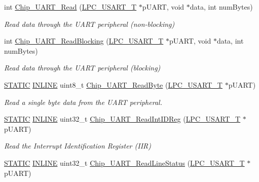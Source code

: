 \begin{DoxyCompactItemize}
int \hyperlink{group__UART__17XX__40XX_ga06dd61ee7d8483847fea746978cb1c93}{Chip\+\_\+\+U\+A\+R\+T\+\_\+\+Read} (\hyperlink{structLPC__USART__T}{L\+P\+C\+\_\+\+U\+S\+A\+R\+T\+\_\+T} $\ast$p\+U\+A\+RT, void $\ast$data, int num\+Bytes)
\begin{DoxyCompactList}\small\item\em Read data through the U\+A\+RT peripheral (non-\/blocking) \end{DoxyCompactList}\item 
int \hyperlink{group__UART__17XX__40XX_ga2b256d39f2fde9f8b923a2f341f5fea3}{Chip\+\_\+\+U\+A\+R\+T\+\_\+\+Read\+Blocking} (\hyperlink{structLPC__USART__T}{L\+P\+C\+\_\+\+U\+S\+A\+R\+T\+\_\+T} $\ast$p\+U\+A\+RT, void $\ast$data, int num\+Bytes)
\begin{DoxyCompactList}\small\item\em Read data through the U\+A\+RT peripheral (blocking) \end{DoxyCompactList}\item 
\hyperlink{group__LPC__Types__Public__Macros_ga10b2d890d871e1489bb02b7e70d9bdfb}{S\+T\+A\+T\+IC} \hyperlink{group__LPC__Types__Public__Types_ga2eb6f9e0395b47b8d5e3eeae4fe0c116}{I\+N\+L\+I\+NE} uint8\+\_\+t \hyperlink{group__UART__17XX__40XX_ga8eec9067080637eea7ecfedac6586fe9}{Chip\+\_\+\+U\+A\+R\+T\+\_\+\+Read\+Byte} (\hyperlink{structLPC__USART__T}{L\+P\+C\+\_\+\+U\+S\+A\+R\+T\+\_\+T} $\ast$p\+U\+A\+RT)
\begin{DoxyCompactList}\small\item\em Read a single byte data from the U\+A\+RT peripheral. \end{DoxyCompactList}\item 
\hyperlink{group__LPC__Types__Public__Macros_ga10b2d890d871e1489bb02b7e70d9bdfb}{S\+T\+A\+T\+IC} \hyperlink{group__LPC__Types__Public__Types_ga2eb6f9e0395b47b8d5e3eeae4fe0c116}{I\+N\+L\+I\+NE} uint32\+\_\+t \hyperlink{group__UART__17XX__40XX_ga6a69343d3d7025055dd2326a8fdd3c74}{Chip\+\_\+\+U\+A\+R\+T\+\_\+\+Read\+Int\+I\+D\+Reg} (\hyperlink{structLPC__USART__T}{L\+P\+C\+\_\+\+U\+S\+A\+R\+T\+\_\+T} $\ast$p\+U\+A\+RT)
\begin{DoxyCompactList}\small\item\em Read the Interrupt Identification Register (I\+IR) \end{DoxyCompactList}\item 
\hyperlink{group__LPC__Types__Public__Macros_ga10b2d890d871e1489bb02b7e70d9bdfb}{S\+T\+A\+T\+IC} \hyperlink{group__LPC__Types__Public__Types_ga2eb6f9e0395b47b8d5e3eeae4fe0c116}{I\+N\+L\+I\+NE} uint32\+\_\+t \hyperlink{group__UART__17XX__40XX_gaf15ab7a9529d102b91760ed5587b279a}{Chip\+\_\+\+U\+A\+R\+T\+\_\+\+Read\+Line\+Status} (\hyperlink{structLPC__USART__T}{L\+P\+C\+\_\+\+U\+S\+A\+R\+T\+\_\+T} $\ast$p\+U\+A\+RT)

\end{DoxyCompactItemize}

